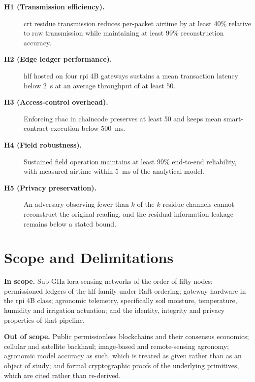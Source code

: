 \documentclass[12pt,a4paper,oneside]{book}
\begin{document}
\begin{description}
  \item[\textnormal{\textbf{H1 (Transmission efficiency).}}] \gls{crt} residue
        transmission reduces per-packet airtime by at least 40\% relative to raw
        transmission while maintaining at least 99\% reconstruction accuracy.

  \item[\textnormal{\textbf{H2 (Edge ledger performance).}}] \gls{hlf} hosted on
        four \gls{rpi} 4B gateways sustains a mean transaction latency below
        \SI{2}{\second} at an average throughput of at least \SI{50}{\tps}.

  \item[\textnormal{\textbf{H3 (Access-control overhead).}}] Enforcing
        \gls{rbac} in chaincode preserves at least \SI{50}{\tps} and keeps mean
        smart-contract execution below \SI{500}{\milli\second}.

  \item[\textnormal{\textbf{H4 (Field robustness).}}] Sustained field operation
        maintains at least 99\% end-to-end reliability, with measured airtime
        within \SI{5}{\milli\second} of the analytical model.

  \item[\textnormal{\textbf{H5 (Privacy preservation).}}] An adversary observing
        fewer than $k$ of the $k$ residue channels cannot reconstruct the
        original reading, and the residual information leakage remains below a
        stated bound.
\end{description}



\section{Scope and Delimitations}
\label{sec:scope}

\textbf{In scope.} Sub-GHz \gls{lora} sensing networks of the order of fifty
nodes; permissioned ledgers of the \gls{hlf} family under Raft ordering;
gateway hardware in the \gls{rpi} 4B class; agronomic telemetry, specifically
soil moisture, temperature, humidity and irrigation actuation; and the
identity, integrity and privacy properties of that pipeline.

\textbf{Out of scope.} Public permissionless blockchains and their consensus
economics; cellular and satellite backhaul; image-based and remote-sensing
agronomy; agronomic model accuracy as such, which is treated as given rather
than as an object of study; and formal cryptographic proofs of the underlying
primitives, which are cited rather than re-derived.
\end{document}
